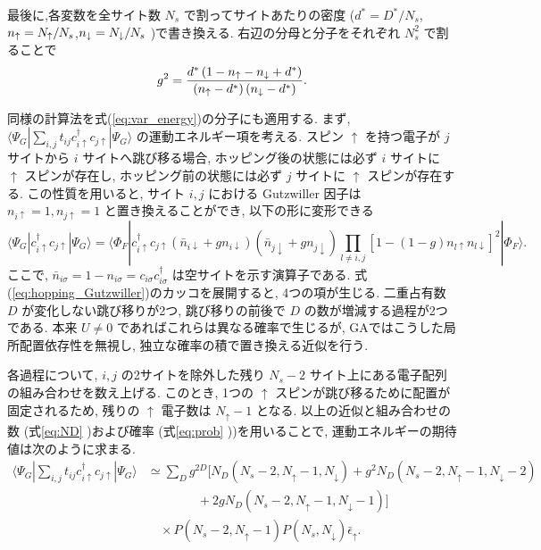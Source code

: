 最後に,各変数を全サイト数 $N_s$ で割ってサイトあたりの密度 ($d^* = D^*/N_s$,$n_{\uparrow} = N_{\uparrow}/N_s$,$n_{\downarrow} = N_{\downarrow}/N_s$ )で書き換える.
右辺の分母と分子をそれぞれ $N_s^2$ で割ることで
\begin{equation}
    g^2 = \frac{d^* \left( 1 - n_{\uparrow} - n_{\downarrow} + d^* \right)}{\left( n_{\uparrow} - d^* \right)\left( n_{\downarrow} - d^* \right)}.
\end{equation}

同様の計算法を式(\ref{eq:var_energy})の分子にも適用する. まず, $\langle \Psi_G | \sum_{i,j} t_{ij} c_{i\uparrow}^\dagger c_{j\uparrow} | \Psi_G \rangle$ の運動エネルギー項を考える. 
スピン $\uparrow$ を持つ電子が $j$ サイトから $i$ サイトへ跳び移る場合, ホッピング後の状態には必ず $i$ サイトに $\uparrow$ スピンが存在し, ホッピング前の状態には必ず $j$ サイトに $\uparrow$ スピンが存在する. この性質を用いると, サイト $i, j$ における Gutzwiller 因子は $n_{i\uparrow}=1, n_{j\uparrow}=1$ と置き換えることができ, 以下の形に変形できる
\begin{equation}
    \langle \Psi_G | c_{i\uparrow}^\dagger c_{j\uparrow} | \Psi_G \rangle = 
    \langle \Phi_F | c_{i\uparrow}^\dagger c_{j\uparrow} (\bar{n}_{i\downarrow} + g n_{i\downarrow})(\bar{n}_{j\downarrow} + g n_{j\downarrow})\prod_{l \neq i,j} [1 - (1-g)n_{l\uparrow}n_{l\downarrow}]^2 | \Phi_F \rangle .
    \label{eq:hopping_Gutzwiller}
\end{equation}
ここで, $\bar{n}_{i\sigma} = 1 - n_{i\sigma} = c_{i\sigma} c_{i\sigma}^\dagger$ は空サイトを示す演算子である. 
式(\ref{eq:hopping_Gutzwiller})のカッコを展開すると, 4つの項が生じる. 
二重占有数 $D$ が変化しない跳び移りが2つ, 跳び移りの前後で $D$ の数が増減する過程が2つである. 本来 $U \neq 0$ であればこれらは異なる確率で生じるが, GAではこうした局所配置依存性を無視し, 独立な確率の積で置き換える近似を行う. 

各過程について, $i, j$ の2サイトを除外した残り $N_s - 2$ サイト上にある電子配列の組み合わせを数え上げる. このとき, 1つの $\uparrow$ スピンが跳び移るために配置が固定されるため, 残りの $\uparrow$ 電子数は $N_\uparrow - 1$ となる. 
以上の近似と組み合わせの数 (式\ref{eq:ND} )および確率 (式\ref{eq:prob} ))を用いることで, 運動エネルギーの期待値は次のように求まる.
\begin{equation}
\begin{split}
    \langle \Psi_G | \sum_{i,j} t_{ij} c_{i\uparrow}^\dagger c_{j\uparrow} | \Psi_G \rangle 
    &\simeq \sum_D g^{2D} \Big[ N_D(N_s-2, N_\uparrow-1, N_\downarrow)+ g^2 N_D(N_s-2, N_\uparrow-1, N_\downarrow-2)\\
    &\qquad\qquad + 2g N_D(N_s-2, N_\uparrow-1, N_\downarrow-1)\Big] \\
    &\quad \times P(N_s-2, N_\uparrow-1)P(N_s, N_\downarrow)\bar{\epsilon}_\uparrow .
\end{split}
\label{eq:kin_energy_expectation}
\end{equation}

